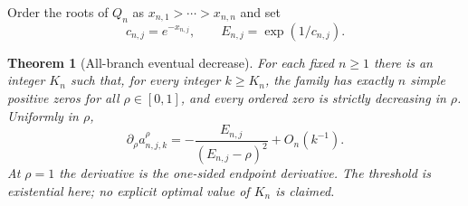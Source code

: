 \documentclass[11pt]{article}
\numberwithin{equation}{section}
\newtheorem{theorem}{Theorem}[section]
\theoremstyle{definition}\newtheorem{definition}[theorem]{Definition}
\theoremstyle{remark}\newtheorem{remark}[theorem]{Remark}
\begin{document}
Order the roots of $Q_n$ as $x_{n,1}>\cdots>x_{n,n}$ and set
\[
c_{n,j}=e^{-x_{n,j}},\qquad E_{n,j}=\exp(1/c_{n,j}).
\]

\begin{theorem}[All-branch eventual decrease]\label{thm:eventualmono}
For each fixed $n\geq1$ there is an integer $K_n$ such that, for every integer $k\geq K_n$, the family has exactly $n$ simple positive zeros for all $\rho\in[0,1]$, and every ordered zero is strictly decreasing in $\rho$. Uniformly in $\rho$,
\begin{equation}\label{eq:eventualvelocity}
\partial_\rho a_{n,j,k}^{\rho}
=-\frac{E_{n,j}}{(E_{n,j}-\rho)^2}+O_n(k^{-1}).
\end{equation}
At $\rho=1$ the derivative is the one-sided endpoint derivative. The threshold is existential here; no explicit optimal value of $K_n$ is claimed.
\end{theorem}
\end{document}
